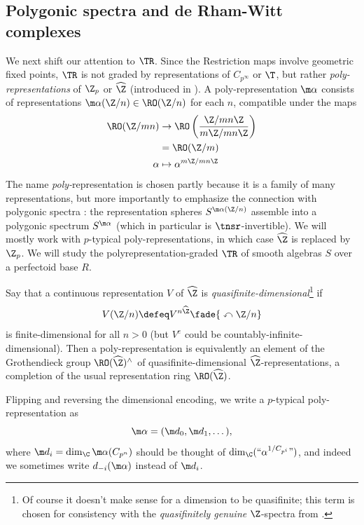 \subsection{Polygonic spectra and de Rham-Witt complexes}
We next shift our attention to $\TR$. Since the Restriction maps involve geometric fixed points, $\TR$ is not graded by representations of $C_{p^\infty}$ or $\T$, but rather \emph{poly-representations} of $\Z_p$ or $\widehat\Z$ (introduced in \cite[]{SulSlopes}). A poly-representation $\m\alpha$ consists of representations $\m\alpha(\Z/n)\in\RO(\Z/n)$ for each $n$, compatible under the maps
\begin{align*}
  \RO(\Z/mn) &\to \RO\left(\frac{\Z/mn\Z}{m\Z/mn\Z}\right)\\
              &= \RO(\Z/m)\\
  \alpha &\mapsto \alpha^{m\Z/mn\Z}
\end{align*}
The name \emph{poly-}representation is chosen partly because it is a family of many representations, but more importantly to emphasize the connection with polygonic spectra \cite{KMNPolygonic}: the representation spheres $S^{\m\alpha(\Z/n)}$ assemble into a polygonic spectrum $S^{\m\alpha}$ (which in particular is $\tnsr$-invertible). We will mostly work with $p$-typical poly-representations, in which case $\widehat\Z$ is replaced by $\Z_p$. We will study the polyrepresentation-graded $\TR$ of smooth algebras $S$ over a perfectoid base $R$.

\begin{remark}
Say that a continuous representation $V$ of $\widehat\Z$ is \emph{quasifinite-dimensional}\footnote{Of course it doesn't make sense for a dimension to be quasifinite; this term is chosen for consistency with the \emph{quasifinitely genuine} $\Z$-spectra from \cite{KMNPolygonic}.} if
\[ V(\Z/n) \defeq V^{n\widehat\Z} \fade{{}\curvearrowleft \Z/n} \]
is finite-dimensional for all $n>0$ (but $V^e$ could be countably-infinite-dimensional). Then a poly-representation is equivalently an element of the Grothendieck group $\RO(\widehat\Z)^\land$ of quasifinite-dimensional $\widehat\Z$-representations, a completion of the usual representation ring $\RO(\widehat\Z)$.
\end{remark}

Flipping and reversing the dimensional encoding, we write a $p$-typical poly-representation as
\[ \m \alpha = (\m d_0, \m d_1, \dotsc), \]
where $\m d_i=\dim_\C\m\alpha(C_{p^n})$ should be thought of $\dim_\C(\text{``$\alpha^{1/C_{p^i}}$''})$, and indeed we sometimes write $d_{-i}(\m\alpha)$ instead of $\m d_i$.

